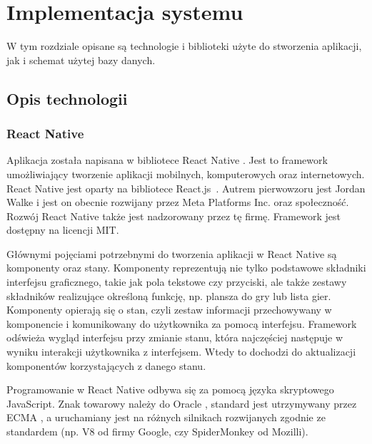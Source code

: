 \chapter{Implementacja systemu}
\thispagestyle{chapterBeginStyle}

	W tym rozdziale opisane są technologie i biblioteki użyte do stworzenia aplikacji, jak i schemat 
użytej bazy danych.



\section{Opis technologii}


\subsection{React Native}
	Aplikacja została napisana w bibliotece React Native \cite{React-Native}. Jest to framework
umożliwiający tworzenie aplikacji mobilnych, komputerowych oraz internetowych. React Native jest oparty
na bibliotece \mbox{React.js \cite{React-Js}}. Autrem pierwowzoru jest Jordan Walke i 
jest on obecnie rozwijany przez Meta Platforms Inc. oraz społeczność. Rozwój React Native także jest 
nadzorowany przez tę firmę. Framework jest dostępny na licencji MIT.

	Głównymi pojęciami potrzebnymi do tworzenia aplikacji w React Native są komponenty oraz stany.
Komponenty reprezentują nie tylko podstawowe składniki interfejsu graficznego, takie jak pola tekstowe czy 
przyciski, ale także zestawy składników realizujące określoną funkcję, np. plansza do gry lub
lista gier. Komponenty opierają się o stan, czyli zestaw informacji przechowywany w komponencie i
komunikowany do użytkownika za pomocą interfejsu. Framework odświeża wygląd interfejsu przy zmianie
stanu, która najczęściej następuje w wyniku interakcji użytkownika z interfejsem. Wtedy to dochodzi
do aktualizacji komponentów korzystających z danego stanu.

	Programowanie w React Native odbywa się za pomocą języka skryptowego JavaScript. Znak towarowy
należy do Oracle \cite{JS-Oracle}, standard jest utrzymywany przez ECMA \cite{JS-ECMA}, 
a uruchamiany jest na różnych silnikach rozwijanych zgodnie ze standardem 
(np. V8 \cite{JS-V8} od firmy Google, czy SpiderMonkey \cite{JS-SpiderMonkey} od Mozilli).


